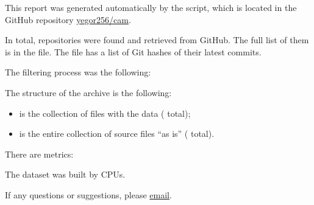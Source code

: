 \documentclass[nobrand,nosecurity]{huawei}
\begin{document}
\maketitle

This report was generated automatically by the script, which is located in
the GitHub repository \href{https://github.com/yegor256/cam}{yegor256/cam}.

In total, \unskip{} repositories
were found and retrieved from GitHub.
The full list of them is in the  file.
The  file has a list of Git hashes of their latest commits.

The filtering process was the following:

\begin{enumerate}
\unskip{}
\end{enumerate}

The structure of the archive is the following:

\begin{itemize}

  \item {} is the collection of  files with the data
  (\unskip{} total);

  \item {} is the entire collection of
  \unskip{}
  source files ``as is''
  (\unskip{} total).

\end{itemize}

There are \unskip{} metrics:

\begin{itemize}
  
\end{itemize}

The dataset was built by
\unskip{}
CPUs\unskip{}.

If any questions or suggestions, please \href{mailto:yegor256@gmail.com}{email}.
\end{document}
